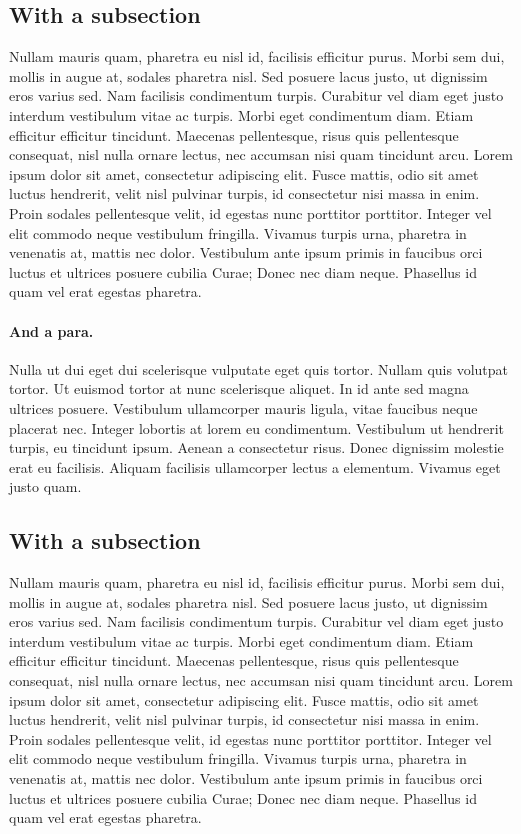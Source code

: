 \subsection{With a subsection}
Nullam mauris quam, pharetra eu nisl id, facilisis efficitur
purus. Morbi sem dui, mollis in augue at, sodales pharetra nisl. Sed
posuere lacus justo, ut dignissim eros varius sed. Nam facilisis
condimentum turpis. Curabitur vel diam eget justo interdum vestibulum
vitae ac turpis. Morbi eget condimentum diam. Etiam efficitur
efficitur tincidunt. Maecenas pellentesque, risus quis pellentesque
consequat, nisl nulla ornare lectus, nec accumsan nisi quam tincidunt
arcu. Lorem ipsum dolor sit amet, consectetur adipiscing elit. Fusce
mattis, odio sit amet luctus hendrerit, velit nisl pulvinar turpis, id
consectetur nisi massa in enim. Proin sodales pellentesque velit, id
egestas nunc porttitor porttitor. Integer vel elit commodo neque
vestibulum fringilla. Vivamus turpis urna, pharetra in venenatis at,
mattis nec dolor. Vestibulum ante ipsum primis in faucibus orci luctus
et ultrices posuere cubilia Curae; Donec nec diam neque. Phasellus id
quam vel erat egestas pharetra.

\paragraph{And a para.} Nulla ut dui eget dui scelerisque vulputate eget quis tortor. Nullam
quis volutpat tortor. Ut euismod tortor at nunc scelerisque
aliquet. In id ante sed magna ultrices posuere. Vestibulum ullamcorper
mauris ligula, vitae faucibus neque placerat nec. Integer lobortis at
lorem eu condimentum. Vestibulum ut hendrerit turpis, eu tincidunt
ipsum. Aenean a consectetur risus. Donec dignissim molestie erat eu
facilisis. Aliquam facilisis ullamcorper lectus a elementum. Vivamus
eget justo quam.
\subsection{With a subsection}
Nullam mauris quam, pharetra eu nisl id, facilisis efficitur
purus. Morbi sem dui, mollis in augue at, sodales pharetra nisl. Sed
posuere lacus justo, ut dignissim eros varius sed. Nam facilisis
condimentum turpis. Curabitur vel diam eget justo interdum vestibulum
vitae ac turpis. Morbi eget condimentum diam. Etiam efficitur
efficitur tincidunt. Maecenas pellentesque, risus quis pellentesque
consequat, nisl nulla ornare lectus, nec accumsan nisi quam tincidunt
arcu. Lorem ipsum dolor sit amet, consectetur adipiscing elit. Fusce
mattis, odio sit amet luctus hendrerit, velit nisl pulvinar turpis, id
consectetur nisi massa in enim. Proin sodales pellentesque velit, id
egestas nunc porttitor porttitor. Integer vel elit commodo neque
vestibulum fringilla. Vivamus turpis urna, pharetra in venenatis at,
mattis nec dolor. Vestibulum ante ipsum primis in faucibus orci luctus
et ultrices posuere cubilia Curae; Donec nec diam neque. Phasellus id
quam vel erat egestas pharetra.


